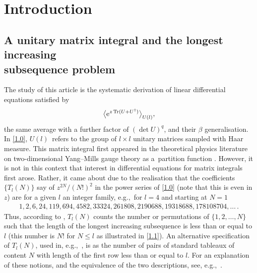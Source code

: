 \documentclass[pdftex]{sigma}
\numberwithin{equation}{section}
\theoremstyle{definition}
\begin{document}


\section{Introduction}

\subsection[A unitary matrix integral and the longest increasing subsequence problem]{A unitary matrix integral and the longest increasing\\ subsequence problem}

The study of this article is the systematic derivation of linear differential equations satisfied by
\begin{equation}\label{1.0}
\big \langle {\rm e}^{z \operatorname{Tr}(U + U^\dagger)} \big \rangle_{U(l)},
\end{equation}
the same average with a further factor of $(\det U)^q$, and their $\beta$ generalisation. In \eqref{1.0}, $U(l)$~refers to the group of $l \times l$ unitary matrices sampled with Haar measure. This matrix integral first appeared in the theoretical physics literature on two-dimensional Yang--Mills gauge theory as a~partition function \cite{Mi75}. However, it is not in this context that interest in differential equations for matrix integrals first arose. Rather, it came about due to the realisation that the coefficients~$\{T_l(N)\}$ say of $z^{2N}/(N!)^2$ in the power series of \eqref{1.0} (note that this is even in $z$) are for a given $l$ an integer family, e.g.,~for $l=4$ and starting at $N=1$
\cite[sequence A047889]{OEIS}
\begin{gather}\label{1.1}
1,2,6,24,119,694,4582,33324,261808,2190688,19318688,
178108704,\dots\,.
\end{gather}
Thus, according to \cite{Ra98}, $T_l(N)$ counts the number or permutations of $\{1,2,\dots,N\}$ such that the length of the longest increasing subsequence is less than or equal to $l$
(this number is $N!$ for $N \le l$ as illustrated in \eqref{1.1}).
{An alternative specification of $T_l(N)$, used in, e.g.,~\cite{BG00}, is
as the number of pairs of standard tableaux of content $N$ with length of the first row less than or equal to $l$}. For an explanation of these notions, and the equivalence of the two descriptions, see, e.g.,~\cite{Fu97,Ro15}.
\end{document}

